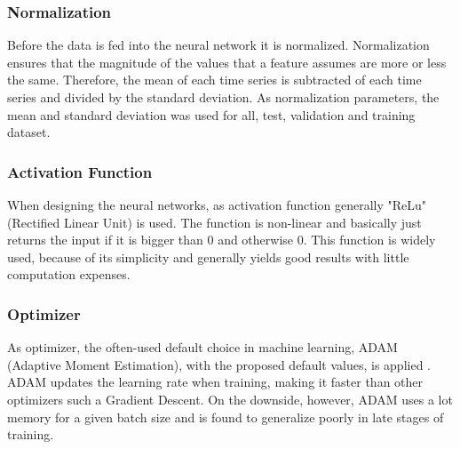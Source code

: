 \subsubsection{Normalization}
Before the data is fed into the neural network it is normalized. Normalization ensures that the magnitude of the values that a feature assumes are more or less the same. Therefore, the mean of each time series is subtracted of each time series and divided by the standard deviation. As normalization parameters, the mean and standard deviation was used for all, test, validation and training dataset.  

\subsubsection{Activation Function}
When designing the neural networks, as activation function generally "ReLu" (Rectified Linear Unit) is used. The function is non-linear and basically just returns the input if it is bigger than 0 and otherwise 0. This function is widely used, because of its simplicity and generally yields good results with little computation expenses.  

\subsubsection{Optimizer}
As optimizer, the often-used default choice in machine learning, ADAM (Adaptive Moment Estimation), with the proposed default values, is applied \parencite{Katanforoosh2019}. ADAM updates the learning rate when training, making it faster than other optimizers such a Gradient Descent. On the downside, however, ADAM uses a lot memory for a given batch size and is found to generalize poorly in late stages of training.

